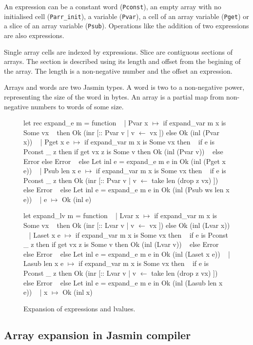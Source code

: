 \documentclass{article}
\begin{document}
An expression can be a constant word (\texttt{Pconst}), an empty array with no
initialised cell (\texttt{Parr\_init}), a variable (\texttt{Pvar}), a cell of an
array variable (\texttt{Pget}) or a slice of an array variable (\texttt{Psub}).
Operations like the addition of two expressions are also expressions.

Single array cells are indexed by expressions. Slice are contiguous sections of
arrays. The section is described using its length and offset from the begining
of the array. The length is a non-negative number and the offset an expression.

\smallskip

Arrays and words are two Jasmin types. A word is two to a non-negative power,
representing the size of the word in bytes. An array is a partial map from
non-negative numbers to words of some size.

\begin{figure}[t]
\obeylines\obeyspaces\ttfamily%
let rec expand\_e m = function
~ | Pvar x \(\mapsto\) if expand\_var m x is Some vx
~   then Ok (inr [:: Pvar v | v \(\gets\) vx ]) else Ok (inl (Pvar x))
~ | Pget x e \(\mapsto\) if expand\_var m x is Some vx then
~     if e is Pconst \_ z then if get vx z is Some v then Ok (inl (Pvar v))
~     else Error else Error
~   else Let inl e = expand\_e m e in Ok (inl (Pget x e))
~ | Psub len x e \(\mapsto\) if expand\_var m x is Some vx then
~     if e is Pconst \_ z then Ok (inr [:: Pvar v | v \(\gets\) take len (drop z vx) ])
~     else Error
~   else Let inl e = expand\_e m e in Ok (inl (Psub ws len x e))
~ | e \(\mapsto\) Ok (inl e)

let expand\_lv m = function
~ | Lvar x \(\mapsto\) if expand\_var m x is Some vx
~   then Ok (inr [:: Lvar v | v \(\gets\) vx ]) else Ok (inl (Lvar x))
~ | Laset x e \(\mapsto\) if expand\_var m x is Some vx then
~     if e is Pconst \_ z then if get vx z is Some v then Ok (inl (Lvar v))
~     else Error else Error
~   else Let inl e = expand\_e m e in Ok (inl (Laset x e))
~ | Lasub len x e \(\mapsto\) if expand\_var m x is Some vx then
~     if e is Pconst \_ z then Ok (inr [:: Lvar v | v \(\gets\) take len (drop z vx) ])
~     else Error
~   else Let inl e = expand\_e m e in Ok (inl (Lasub len x e))
~ | x \(\mapsto\) Ok (inl x)
\normalfont%
\caption{Expansion of expressions and lvalues.}\label{fig:fullexp}
\end{figure}

\subsection{Array expansion in Jasmin compiler}
\end{document}
